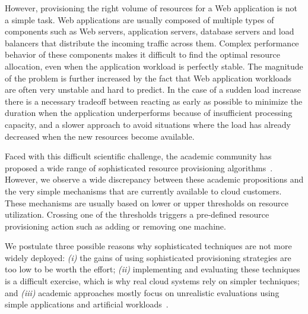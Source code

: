 However, provisioning the right volume of resources for a Web
application is not a simple task. Web applications are usually
composed of multiple types of components such as Web servers,
application servers, database servers and load balancers that
distribute the incoming traffic across them. Complex performance
behavior of these components makes it difficult to find the optimal
resource allocation, even when the application workload is perfectly
stable. The magnitude of the problem is further increased by the fact
that Web application workloads are often very unstable and hard to
predict. In the case of a sudden load increase there is a necessary
tradeoff between reacting as early as possible to minimize the
duration when the application underperforms because of insufficient
processing capacity, and a slower approach to avoid situations where
the load has already decreased when the new resources become
available.

Faced with this difficult scientific challenge, the academic community
has proposed a wide range of sophisticated resource provisioning
algorithms~\cite{dejun2011,muppala_regression-based_2012, urgaonkar_agile_2008, vasic_dejavu_2012}. 
However, we observe a wide discrepancy between these academic
propositions and the very simple mechanisms that are currently
available to cloud customers. These mechanisms are usually based on
lower or upper thresholds on resource utilization. Crossing one of the
thresholds triggers a pre-defined resource provisioning action such as
adding or removing one machine.

We postulate three possible reasons why sophisticated techniques are
not more widely deployed: \emph{(i)} the gains of using
sophisticated provisioning strategies are too low to be worth the
effort; \emph{(ii)} implementing and evaluating these techniques is a
difficult exercise, which is why real cloud systems rely on simpler
techniques; and \emph{(iii)} academic approaches mostly focus on
unrealistic evaluations using simple applications and artificial
workloads~\cite{do_profiling_2011, islam_empirical_2012}. %

